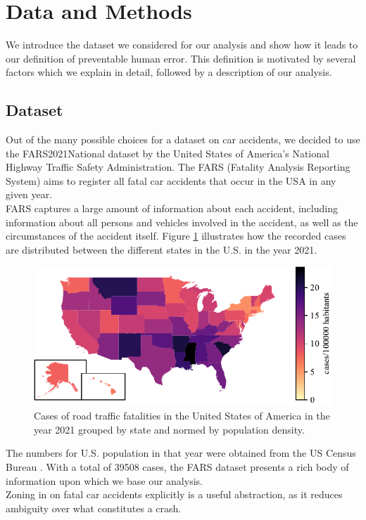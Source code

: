\documentclass{article}
\theoremstyle{plain}
\theoremstyle{definition}
\theoremstyle{remark}
\begin{document}

\section{Data and Methods}\label{sec:methods}
We introduce the dataset we considered for our analysis and show how it leads to our definition of preventable human error. This definition is motivated by several factors which we explain in detail, followed by a description of our analysis.


\subsection{Dataset}
Out of the many possible choices for a dataset on car accidents, we decided to use the FARS2021National dataset by the United States of America's National Highway Traffic Safety Administration. The FARS (Fatality Analysis Reporting System) aims to register all fatal car accidents that occur in the USA in any given year.
\\
FARS captures a large amount of information about each accident, including information about all persons and vehicles involved in the accident, as well as the circumstances of the accident itself. Figure \ref{fig:cases-fars} illustrates how the recorded cases are distributed between the different states in the U.S. in the year 2021.
\begin{figure}[ht]
	\vskip 0.2in
	\begin{center}
		\includegraphics[width = \columnwidth]{plots/cases-fars}
		\caption{Cases of road traffic fatalities in the United States of America in the year 2021 grouped by state and normed by population density.}
		\label{fig:cases-fars}
	\end{center}
	\vskip -0.2in
\end{figure}
The numbers for U.S. population in that year were obtained from the US Census Bureau \cite{census}. With a total of 39508 cases, the FARS dataset presents a rich body of information upon which we base our analysis.
\\
Zoning in on fatal car accidents explicitly is a useful abstraction, as it reduces ambiguity over what constitutes a crash.
\end{document}
